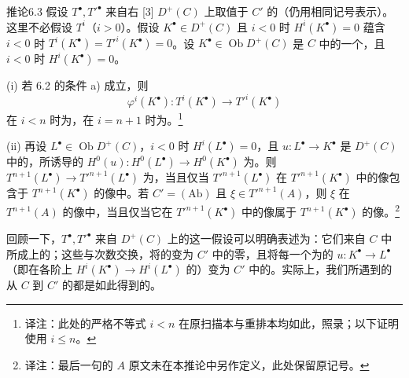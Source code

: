 \begin{SGAresult}{推论}{6.3}
假设 $T^\bullet,T'^\bullet$ 来自右 [3] $D^+(C)$ 上取值于 $C'$ 的（仍用相同记号表示）。这里不必假设 $T^i$（$i>0$）。假设 $K^\bullet\in D^+(C)$ 且 $i<0$ 时 $H^i(K^\bullet)=0$ 蕴含 $i<0$ 时 $T^i(K^\bullet)=T'^i(K^\bullet)=0$。设 $K^\bullet\in\operatorname{Ob}D^+(C)$ 是 $C$ 中的一个，且 $i<0$ 时 $H^i(K^\bullet)=0$。

(i) 若 6.2 的条件 a) 成立，则
\[
\varphi^i(K^\bullet):T^i(K^\bullet)\longrightarrow T'^i(K^\bullet)
\]
在 $i<n$ 时为，在 $i=n+1$ 时为。\footnote{译注：此处的严格不等式 $i<n$ 在原扫描本与重排本均如此，照录；以下证明使用 $i\leq n$。}

(ii) 再设 $L^\bullet\in\operatorname{Ob}D^+(C)$，$i<0$ 时 $H^i(L^\bullet)=0$，且 $u:L^\bullet\to K^\bullet$ 是 $D^+(C)$ 中的，所诱导的 $H^0(u):H^0(L^\bullet)\to H^0(K^\bullet)$ 为。则 $T^{n+1}(L^\bullet)\to T'^{n+1}(L^\bullet)$ 为，当且仅当 $T'^{n+1}(L^\bullet)$ 在 $T'^{n+1}(K^\bullet)$ 中的像包含于 $T^{n+1}(K^\bullet)$ 的像中。若 $C'=(\mathrm{Ab})$ 且 $\xi\in T'^{n+1}(A)$，则 $\xi$ 在 $T^{n+1}(A)$ 的像中，当且仅当它在 $T'^{n+1}(K^\bullet)$ 中的像属于 $T^{n+1}(K^\bullet)$ 的像。\footnote{译注：最后一句的 $A$ 原文未在本推论中另作定义，此处保留原记号。}
\end{SGAresult}
回顾一下，$T^\bullet,T'^\bullet$ 来自 $D^+(C)$ 上的这一假设可以明确表述为：它们来自 $C$ 中所成上的；这些与次数交换，将的变为 $C'$ 中的零，且将每一个为的
$u:K^\bullet\to L^\bullet$（即在各阶上 $H^i(K^\bullet)\to H^i(L^\bullet)$ 的）变为 $C'$ 中的。实际上，我们所遇到的从 $C$ 到 $C'$ 的都是如此得到的。

